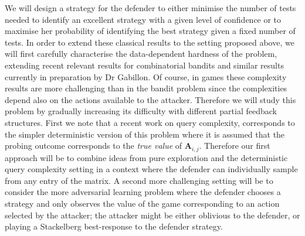  We will design a strategy for the defender to either minimise the number of tests needed to identify an excellent strategy with a given level of confidence or to maximise her probability of identifying the best strategy given a fixed number of tests\cite{Maron93HR,Audibert10BA}. 
 In order to extend these  classical results to the setting proposed above, we will first carefully characterise the data-dependent hardness of the problem, extending recent relevant results for combinatorial bandits\cite{chen2014combinatorial} and similar results currently in preparation by Dr Gabillon.  Of course, in games these complexity results are more challenging than in the bandit problem since the complexities depend also on the actions available to the attacker.
  Therefore we will study this problem by gradually increasing its difficulty with different partial feedback structures. First we note that a recent work\cite{goldberg2014query} on query complexity, corresponds to the simpler deterministic  version of this problem where it is assumed that the probing outcome corresponds to the {\em true value} of $\boldsymbol A_{i,j}$. %
Therefore our first approach will be to combine ideas from pure exploration and the deterministic query complexity setting in a context where the defender can individually sample from any entry of the matrix. A second more challenging setting will be to consider the more adversarial learning problem where the defender chooses a strategy and only observes the value of the game corresponding to an action selected by the attacker; the attacker might be either oblivious to the defender, or playing a Stackelberg best-response to the defender strategy.
